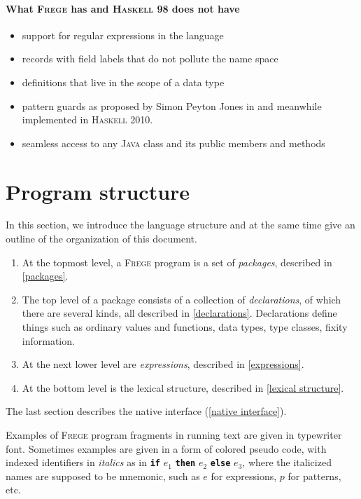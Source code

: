 \documentclass[lletterpaper,12pt]{report}
\newcommand{\haskell}[0]{\textsc{Haskell}}
\newcommand{\frege}[0]{\textsc{Frege}}
\newcommand{\java}[0]{\textsc{Java}}
\newcommand{\term}[1]{\textbf{\texttt{\textcolor{trmred}{#1}}}}
\begin{document}
\paragraph{What \frege{} has and \haskell{} 98 does not have}
\begin{itemize}
\item support for regular expressions in the language
\item records with field labels that do not pollute the name space
\item definitions that live in the scope of a data type
\item pattern guards as proposed by Simon Peyton Jones in \cite{pguards}
and meanwhile implemented in \haskell{} 2010.
\item seamless access to any \java{} class and its public members and methods
\end{itemize}

\section{Program structure}

In this section, we introduce the language structure and at the
same time give an outline of the organization of this
document.

\begin{enumerate}

\item At the topmost level, a \frege{} program is a set of
\emph{packages}, described in \autoref{packages}.

\item The top level of a package consists of a collection of
\emph{declarations},
of which there are several kinds, all described in
\autoref{declarations}.
Declarations define things such as ordinary values and functions,
data types,
type classes, fixity information.

\item At the next lower level are \emph{expressions}, described in
\autoref{expressions}.

\item At the bottom level is the lexical structure, described in
\autoref{lexical structure}.

\end{enumerate}

The last section describes  the native interface
(\autoref{native interface}).

Examples of \frege{} program fragments in running text are given in
typewriter font. Sometimes examples are given in a form of
colored pseudo code,
with indexed identifiers in \emph{italics} as in \term{if} $e_1$
\term{then} $e_2$ \term{else} $e_3$, where the  italicized names are
supposed to be mnemonic, such as $e$ for expressions, $p$ for patterns,
etc.
\end{document}
